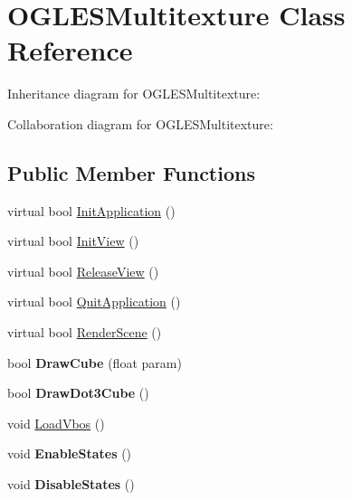 \hypertarget{class_o_g_l_e_s_multitexture}{\section{O\+G\+L\+E\+S\+Multitexture Class Reference}
\label{class_o_g_l_e_s_multitexture}
}


Inheritance diagram for O\+G\+L\+E\+S\+Multitexture\+:


Collaboration diagram for O\+G\+L\+E\+S\+Multitexture\+:
\subsection*{Public Member Functions}
\begin{DoxyCompactItemize}
\item 
virtual bool \hyperlink{class_o_g_l_e_s_multitexture_a7ef089ac4feb8b1e49984ba94a7ce175}{Init\+Application} ()
\item 
virtual bool \hyperlink{class_o_g_l_e_s_multitexture_abad3cdcd35e378d84073d86bcaa3d895}{Init\+View} ()
\item 
virtual bool \hyperlink{class_o_g_l_e_s_multitexture_a1092b6e87f0ae69334316db06d782b46}{Release\+View} ()
\item 
virtual bool \hyperlink{class_o_g_l_e_s_multitexture_a1cbbb7408bc9d0437aad5cf58f8c13f7}{Quit\+Application} ()
\item 
virtual bool \hyperlink{class_o_g_l_e_s_multitexture_a471370701542ba2ed7538080ed21fb25}{Render\+Scene} ()
\item 
\hypertarget{class_o_g_l_e_s_multitexture_ada3bf132658e89ed0b9037a1a5770b38}{bool {\bfseries Draw\+Cube} (float param)}\label{class_o_g_l_e_s_multitexture_ada3bf132658e89ed0b9037a1a5770b38}

\item 
\hypertarget{class_o_g_l_e_s_multitexture_a9d50756e20fc7ab73baf9f15e58eacca}{bool {\bfseries Draw\+Dot3\+Cube} ()}\label{class_o_g_l_e_s_multitexture_a9d50756e20fc7ab73baf9f15e58eacca}

\item 
void \hyperlink{class_o_g_l_e_s_multitexture_aaf50692d528594ec5f32f4cbfa09c676}{Load\+Vbos} ()
\item 
\hypertarget{class_o_g_l_e_s_multitexture_a6a0b1fb1f7fb4adbd17f6a5e20b5e9b7}{void {\bfseries Enable\+States} ()}\label{class_o_g_l_e_s_multitexture_a6a0b1fb1f7fb4adbd17f6a5e20b5e9b7}

\item 
\hypertarget{class_o_g_l_e_s_multitexture_ac3c9a984c82ad13d4feacf2866146cd4}{void {\bfseries Disable\+States} ()}\label{class_o_g_l_e_s_multitexture_ac3c9a984c82ad13d4feacf2866146cd4}

\end{DoxyCompactItemize}


